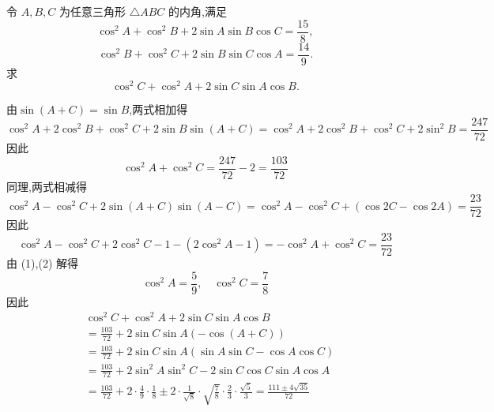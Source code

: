 \begin{questions}
   \question 令 $A, B, C$ 为任意三角形 $\triangle ABC$ 的内角,满足
    \[
    \cos^{2}A + \cos^{2}B + 2 \sin A \sin B \cos C = \frac{15}{8},
    \]
    \[
    \cos^{2}B + \cos^{2}C + 2 \sin B \sin C \cos A = \frac{14}{9}.
    \]
    求
    \[
    \cos^{2}C + \cos^{2}A + 2 \sin C \sin A \cos B.
    \]
    \begin{solution}
        由$\sin (A + C)=\sin B$,两式相加得
        \[
        \cos^{2}A + 2 \cos^{2}B + \cos^{2}C + 2 \sin B \sin (A + C) = \cos^{2}A + 2 \cos^{2}B + \cos^{2}C + 2 \sin^{2} B = \frac{247}{72}
        \]
        因此
        \[
        \cos^{2}A + \cos^{2}C = \frac{247}{72} - 2 = \frac{103}{72} \tag{1}
        \]
        同理,两式相减得
        \[
        \cos^{2}A - \cos^{2}C + 2 \sin (A+C) \sin (A - C) = \cos^{2}A - \cos^{2}C + (\cos 2C - \cos 2A) =  \frac{23}{72}
        \]
        因此
        \[
        \cos^{2}A - \cos^{2}C + 2 \cos^{2}C - 1 - (2 \cos^{2}A - 1) = -\cos^{2}A + \cos^{2}C = \frac{23}{72} \tag{2}
        \]
        由 (1),(2) 解得
        \[
        \cos^{2}A = \frac{5}{9}, \quad \cos^{2}C = \frac{7}{8}
        \]
        因此
        \begin{align*}
        &\cos^{2}C + \cos^{2}A + 2 \sin C \sin A \cos B \\
        &= \frac{103}{72} + 2 \sin C \sin A (-\cos (A + C))\\
        &= \frac{103}{72} + 2 \sin C \sin A (\sin A \sin C - \cos A \cos C) \\
        &= \frac{103}{72} + 2 \sin^{2} A \sin^{2} C - 2 \sin C \cos C \sin A \cos A\\
        &= \frac{103}{72} + 2 \cdot \frac{4}{9} \cdot \frac{1}{8} \pm 2 \cdot \frac{1}{\sqrt{8}} \cdot \sqrt{\frac{7}{8}} \cdot \frac{2}{3} \cdot \frac{\sqrt{5}}{3} = \frac{111\pm4 \sqrt{35}}{72}
        \end{align*}
    \end{solution}


\end{questions}
